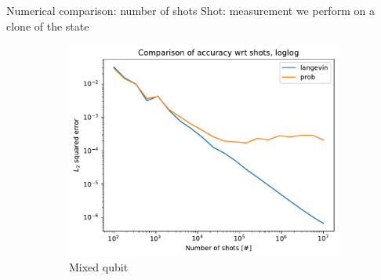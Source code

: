 \documentclass{beamer}
\begin{document}
\begin{frame}{Numerical comparison: number of shots}
    Shot: measurement we perform on a clone of the state
    \begin{figure}[H]

        \centering
    
        \begin{subfigure}[b]{0.49\textwidth}
    
    
            \centering
    
            \includegraphics[width=\textwidth]{figures/experiments/shots/shots_acc_comp_shots_exp_loglog-1.png}
    
            \caption{Mixed qubit}
    
            \label{fig:shots-comp-mixed-sub}
    
        \end{subfigure}
        \hfill
        \begin{subfigure}[b]{0.49\textwidth}
    
    
            \centering
    

\end{subfigure}
\end{figure}
\end{frame}
\end{document}
